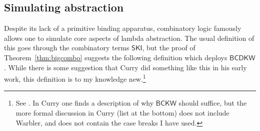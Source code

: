 \documentclass{lmcs} %
\begin{document}
\subsection{Simulating abstraction}\label{sec:simabs}

Despite its lack of a primitive binding apparatus, combinatory logic famously allows one to simulate core aspects of lambda abstraction. The usual definition of this goes through the combinatory terms $\mathsf{SKI}$, but the proof of Theorem~\ref{thm:bigcombo} suggests the following definition which deploys $\mathsf{BCDKW}$. While there is some suggestion that Curry did something like this in his early work, this definition is to my knowledge new.\footnote{See \cite[\S{5}]{Cardone2006-qk}. In Curry \cite[p. 238]{Curry1958-yi} one finds a description of why  $\mathsf{BCKW}$ should suffice, but the more formal discussion  in Curry \cite[p. 190]{Curry1958-yi} (list at the bottom) does not include Warbler, and does not contain the case breaks I have used.}
\end{document}

